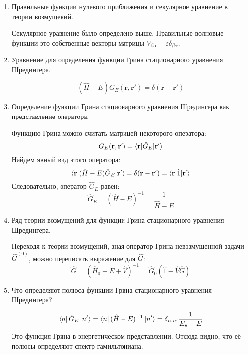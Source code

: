 \documentclass{article}
\begin{document}
\begin{enumerate}
		\item {Правильные функции нулевого приближения и секулярное уравнение в теории возмущений.}
		
		Секулярное уравнение было определено выше. Правильные волновые функции это собственные векторы матрицы $V_{\beta\alpha} - \varepsilon \delta_{\beta\alpha}$.
		
		\item {Уравнение для определения функции Грина стационарного уравнения Шредингера.}
		
		\begin{equation}
			(\hat{H} - E) G_E(\textbf{r}, \textbf{r}') = \delta(\textbf{r} - \textbf{r}')
		\end{equation}
		\item {Определение функции Грина стационарного уравнения Шредингера как представление оператора.}
		
		Функцию Грина можно считать матрицей некоторого оператора:
		\begin{equation}
			G_E(\textbf{r}, \textbf{r}') = \braket{\textbf{r}|\hat{G}_E|\textbf{r}'}
		\end{equation}
		Найдем явный вид этого оператора:
		\begin{equation}
			\braket{\textbf{r}|(\hat{H} - E)\hat{G}_E | \textbf{r}'} = \delta (\textbf{r} - \textbf{r}') = \braket{\textbf{r}|\hat{1}| \textbf{r}'}
		\end{equation}
		Следовательно, оператор $\hat{G}_E$ равен:
		\begin{equation}
			\hat{G}_E = (\hat{H} - E)^{-1} = \frac{1}{\hat{H} - E}
		\end{equation}
		
		\item {Ряд теории возмущений для функции Грина стационарного уравнения Шредингера.}
		
		Переходя к теории возмущений, зная оператор Грина невозмущенной задачи $\hat{G}^{(0)}$, можно переписать выражение для $\hat{G}$:
		\begin{equation}
			\hat{G} = (\hat{H}_0 - E + \hat{V})^{-1} = \hat{G}_0 (\hat{1} - \hat{V}\hat{G})
		\end{equation}
		
		
		\item {Что определяют полюса функции Грина стационарного уравнения Шредингера?}	
		
		\begin{equation}
			\bra{n}\hat{G}_{E}\ket{n'}=\bra{n}(\hat{H}-E)^{-1}\ket{n'}=\delta_{n,n'}\frac{1}{E_{n}-E}
		\end{equation}
		Это функция Грина в энергетическом представлении. Отсюда видно,
что её полюсы определяют спектр гамильтониана.


\end{enumerate}
\end{document}
